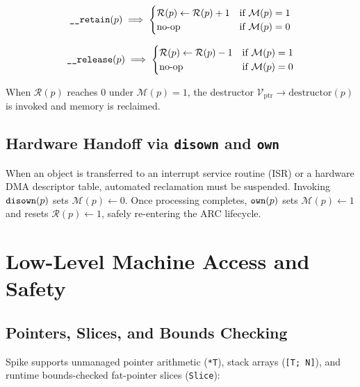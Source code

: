 \documentclass[10pt,twocolumn]{article}
\begin{document}
\begin{equation}
\text{\texttt{\_\_retain}}(p) \implies \begin{cases} 
\mathcal{R}(p) \leftarrow \mathcal{R}(p) + 1 & \text{if } \mathcal{M}(p) = 1 \\
\text{no-op} & \text{if } \mathcal{M}(p) = 0 
\end{cases}
\end{equation}

\begin{equation}
\text{\texttt{\_\_release}}(p) \implies \begin{cases} 
\mathcal{R}(p) \leftarrow \mathcal{R}(p) - 1 & \text{if } \mathcal{M}(p) = 1 \\
\text{no-op} & \text{if } \mathcal{M}(p) = 0 
\end{cases}
\end{equation}

When $\mathcal{R}(p)$ reaches 0 under $\mathcal{M}(p) = 1$, the destructor $\mathcal{V}_{\text{ptr}} \rightarrow \text{destructor}(p)$ is invoked and memory is reclaimed.

\subsection{Hardware Handoff via \texttt{disown} and \texttt{own}}
When an object is transferred to an interrupt service routine (ISR) or a hardware DMA descriptor table, automated reclamation must be suspended. Invoking $\text{\texttt{disown}}(p)$ sets $\mathcal{M}(p) \leftarrow 0$. Once processing completes, $\text{\texttt{own}}(p)$ sets $\mathcal{M}(p) \leftarrow 1$ and resets $\mathcal{R}(p) \leftarrow 1$, safely re-entering the ARC lifecycle.

\section{Low-Level Machine Access and Safety}

\subsection{Pointers, Slices, and Bounds Checking}
Spike supports unmanaged pointer arithmetic (\texttt{*T}), stack arrays (\texttt{[T; N]}), and runtime bounds-checked fat-pointer slices (\texttt{Slice}):
\end{document}
